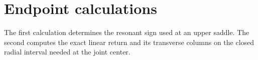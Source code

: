 \section{Endpoint calculations}
\label{rw:app:endpoints}

The first calculation determines the resonant sign used at an upper
saddle. The second computes the exact linear return and its transverse
columns on the closed radial interval needed at the joint center.



